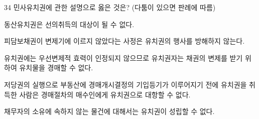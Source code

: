 \begin{question}{34}
민사유치권에 관한 설명으로 옳은 것은? (다툼이 있으면 판례에 따름)
\begin{choices}
  \item 동산유치권은 선의취득의 대상이 될 수 없다.
  \item 피담보채권이 변제기에 이르지 않았다는 사정은 유치권의 행사를 방해하지 않는다.
  \item 유치권에는 우선변제적 효력이 인정되지 않으므로 유치권자는 채권의 변제를 받기 위하여 유치물을 경매할 수 없다.
  \item 저당권의 실행으로 부동산에 경매개시결정의 기입등기가 이루어지기 전에 유치권을 취득한 사람은 경매절차의 매수인에게 유치권으로 대항할 수 없다.
  \item 채무자의 소유에 속하지 않는 물건에 대해서는 유치권이 성립할 수 없다.
\end{choices}
\end{question}
